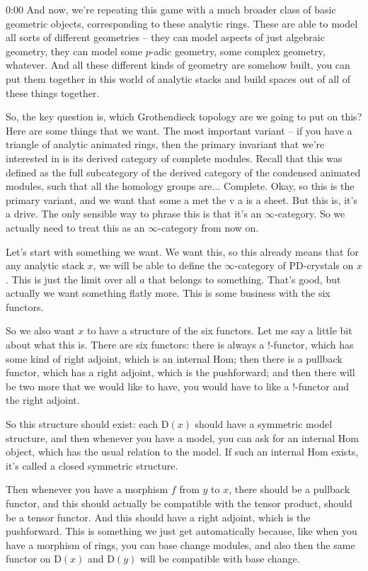\begin{unfinished}{0:00}
And now, we're repeating this game with a much broader class of basic geometric objects, corresponding to these analytic rings. These are able to model all sorts of different geometries -- they can model aspects of just algebraic geometry, they can model some $p$-adic geometry, some complex geometry, whatever. And all these different kinds of geometry are somehow built, you can put them together in this world of analytic stacks and build spaces out of all of these things together.

So, the key question is, which Grothendieck topology are we going to put on this? Here are some things that we want. The most important variant -- if you have a triangle of analytic animated rings, then the primary invariant that we're interested in is its derived category of complete modules. Recall that this was defined as the full subcategory of the derived category of the condensed animated modules, such that all the homology groups are...
Complete. Okay, so this is the primary variant, and we want that some a met the v a is a sheet. But this is, it's a drive. The only sensible way to phrase this is that it's an $\infty$-category. So we actually need to treat this as an $\infty$-category from now on.

Let's start with something we want. We want this, so this already means that for any analytic stack $x$, we will be able to define the $\infty$-category of $\mathrm{PD}$-crystals on $x$. This is just the limit over all $a$ that belongs to something. That's good, but actually we want something flatly more. This is some business with the six functors.

So we also want $x$ to have a structure of the six functors. Let me say a little bit about what this is. There are six functors: there is always a !-functor, which has some kind of right adjoint, which is an internal Hom; then there is a pullback functor, which has a right adjoint, which is the pushforward; and then there will be two more that we would like to have, you would have to like a $!$-functor and the right adjoint.

So this structure should exist: each $\mathrm{D}(x)$ should have a symmetric model structure, and then whenever you have a model, you can ask for an internal Hom object, which has the usual relation to the model. If such an internal Hom exists, it's called a closed symmetric structure.

Then whenever you have a morphism $f$ from $y$ to $x$, there should be a pullback functor, and this should actually be compatible with the tensor product, should be a tensor functor. And this should have a right adjoint, which is the pushforward. This is something we just get automatically because, like when you have a morphism of rings, you can base change modules, and also then the same functor on $\mathrm{D}(x)$ and $\mathrm{D}(y)$ will be compatible with base change.


\end{unfinished}
